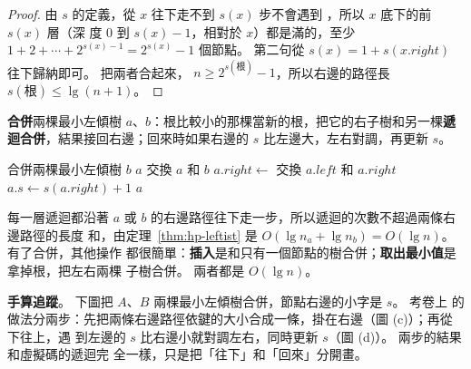 \begin{proof}
由 $s$ 的定義，從 $x$ 往下走不到 $s(x)$ 步不會遇到 \NIL，所以 $x$ 底下的前 $s(x)$ 層（深
度 $0$ 到 $s(x) - 1$，相對於 $x$）都是滿的，至少 $1 + 2 + \cdots + 2^{s(x) - 1} = 2^{s(x)}
- 1$ 個節點。 第二句從 $s(x) = 1 + s(x.\mathit{right})$ 往下歸納即可。 把兩者合起來，
$n \ge 2^{s(\text{根})} - 1$，所以右邊的路徑長 $s(\text{根}) \le \lg(n + 1)$。
\end{proof}

\textbf{合併}兩棵最小左傾樹 $a$、$b$：根比較小的那棵當新的根，把它的右子樹和另一棵\textbf{遞
迴合併}，結果接回右邊；回來時如果右邊的 $s$ 比左邊大，左右對調，再更新 $s$。

\begin{pseudo}[label=alg:hp-meld]{合併兩棵最小左傾樹}
        \State \Return $b$
    \EndIf
        \State \Return $a$
    \EndIf
        \State 交換 $a$ 和 $b$ 
    \EndIf
    \State $a.\mathit{right} \gets$ 
        \State 交換 $a.\mathit{left}$ 和 $a.\mathit{right}$
    \EndIf
    \State $a.s \gets s(a.\mathit{right}) + 1$
    \State \Return $a$
\EndFunction
\end{pseudo}

每一層遞迴都沿著 $a$ 或 $b$ 的右邊路徑往下走一步，所以遞迴的次數不超過兩條右邊路徑的長度
和，由定理~\ref{thm:hp-leftist} 是 $O(\lg n_a + \lg n_b) = O(\lg n)$。 有了合併，其他操作
都很簡單：\textbf{插入}是和只有一個節點的樹合併；\textbf{取出最小值}是拿掉根，把左右兩棵
子樹合併。 兩者都是 $O(\lg n)$。

\textbf{手算追蹤}。 下圖把 $A$、$B$ 兩棵最小左傾樹合併，節點右邊的小字是 $s$。 考卷上
的做法分兩步：先把兩條右邊路徑依鍵的大小合成一條，掛在右邊（圖 (c)）；再從下往上，遇
到左邊的 $s$ 比右邊小就對調左右，同時更新 $s$（圖 (d)）。 兩步的結果和虛擬碼的遞迴完
全一樣，只是把「往下」和「回來」分開畫。

